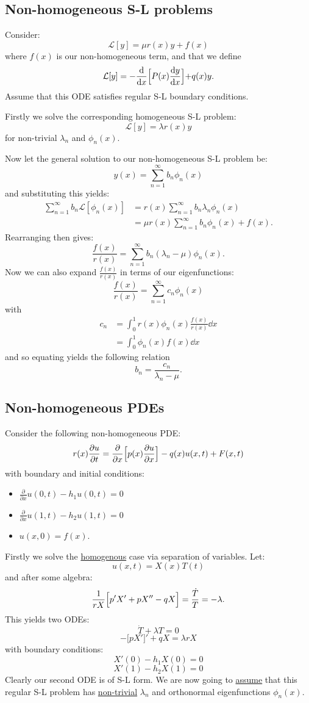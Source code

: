 \documentclass{article}
\begin{document}
\newpage

\subsection{Non-homogeneous S-L problems}
Consider:
$$\mathcal{L}[y]=\mu r(x)y+f(x)$$
where $f(x)$ is our non-homogeneous term, and that we define
$$\mathcal{L}[y]=-\dv{x}\Bigl[P(x)\dv{y}{x}\Bigl]+q(x)y.$$
Assume that this ODE satisfies regular S-L boundary conditions.

Firstly we solve the corresponding homogeneous S-L problem:
$$\mathcal{L}[y]=\lambda r(x)y$$
for non-trivial $\lambda_n$ and $\phi_n(x)$.

Now let the general solution to our non-homogeneous S-L problem be:
$$y(x)=\sum_{n=1}^{\infty} b_n\phi_n(x)$$
and substituting this yields:
\begin{align*}
    \sum_{n=1}^{\infty}b_n\mathcal{L}[\phi_n(x)]
    &=r(x)\sum_{n=1}^{\infty}b_n\lambda_n\phi_n(x) \\
    &=\mu r(x)\sum_{n=1}^{\infty}b_n\phi_n(x)+f(x).
\end{align*}
Rearranging then gives:
$$\frac{f(x)}{r(x)}=\sum_{n=1}^{\infty}
b_n(\lambda_n-\mu)\phi_n(x).$$
Now we can also expand $\displaystyle\frac{f(x)}{r(x)}$
in terms of our eigenfunctions:
$$\frac{f(x)}{r(x)}=\sum_{n=1}^{\infty}c_n\phi_n(x)$$
with
\begin{align*}
    c_n
    &=\int_{0}^{1}r(x)\phi_n(x)
    \frac{f(x)}{r(x)} \dd x \\
    &=\int_{0}^{1}\phi_n(x)f(x)\dd x
\end{align*}
and so equating yields the following relation
$$b_n=\frac{c_n}{\lambda_n-\mu}.$$

\newpage

\subsection{Non-homogeneous PDEs}
Consider the following non-homogeneous PDE:
$$r(x)\frac{\partial u}{\partial t}
=\frac{\partial}{\partial x}\Bigl[
p(x)\frac{\partial u}{\partial x}
\Bigr]-q(x)u(x,t)+F(x,t)$$
with boundary and initial conditions:
\begin{itemize}
    \item $\displaystyle\frac{\partial}{\partial x}
    u(0,t)-h_1 u(0,t)=0$
    \item $\displaystyle\frac{\partial}{\partial x}
    u(1,t)-h_2 u(1,t)=0$
    \item $u(x,0)=f(x)$.
\end{itemize}
Firstly we solve the \underline{homogenous} 
case via separation of variables. Let:
$$u(x,t)=X(x)T(t)$$
and after some algebra:
$$\frac{1}{rX}\Bigl[p'X'+pX''
-qX\Bigr]=\frac{\dot{T}}{T}=-\lambda.$$
This yields two ODEs:
$$\dot{T}+\lambda T=0$$
$$-\bigl[pX'\bigr]'+qX=\lambda rX$$
with boundary conditions:
$$X'(0)-h_1 X(0)=0$$
$$X'(1)-h_2 X(1)=0$$
Clearly our second ODE is of S-L form.
We are now going to \underline{assume} that this
regular S-L problem has \underline{non-trivial} $\lambda_n$
and orthonormal eigenfunctions $\phi_n(x)$.
\end{document}
